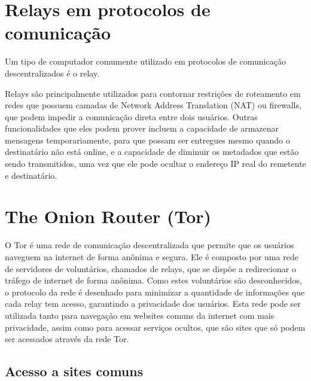 \section {Relays em protocolos de comunicação}

Um tipo de computador comumente utilizado em protocolos de comunicação descentralizados é o relay.


Relays são principalmente utilizados para contornar restrições de roteamento em redes que possuem camadas de Network Address Translation (NAT) ou firewalls, que podem impedir a comunicação direta entre dois usuários. Outras funcionalidades que eles podem prover incluem a capacidade de armazenar mensagens temporariamente, para que possam ser entregues mesmo quando o destinatário não está online, e a capacidade de diminuir os metadados que estão sendo transmitidos, uma vez que ele pode ocultar o endereço IP real do remetente e destinatário.

\section{The Onion Router (Tor)}

O Tor é uma rede de comunicação descentralizada que permite que os usuários naveguem na internet de forma anônima e segura. Ele é composto por uma rede de servidores de voluntários, chamados de relays, que se dispõe a redirecionar o tráfego de internet de forma anônima. Como estes voluntários são desconhecidos, o protocolo da rede é desenhado para minimizar a quantidade de informações que cada relay tem acesso, garantindo a privacidade dos usuários. Esta rede pode ser utilizada tanto para navegação em websites comuns da internet com mais privacidade, assim como para acessar serviços ocultos, que são sites que só podem ser acessados através da rede Tor.

\subsection{Acesso a sites comuns}

